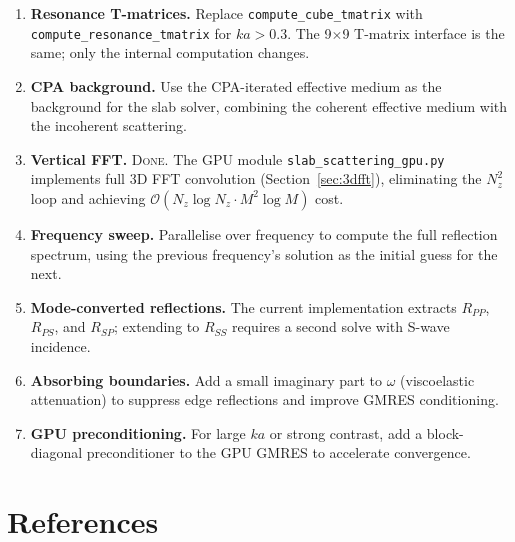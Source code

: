 \documentclass[11pt,a4paper]{article}
\newcommand{\order}{\mathcal{O}}
\begin{document}
\begin{enumerate}
  \item \textbf{Resonance T-matrices.}  Replace
    \texttt{compute\_cube\_tmatrix} with
    \texttt{compute\_resonance\_tmatrix} for $ka > 0.3$.  The
    9$\times$9 T-matrix interface is the same; only the internal
    computation changes.

  \item \textbf{CPA background.}  Use the CPA-iterated effective
    medium as the background for the slab solver, combining
    the coherent effective medium with the incoherent scattering.

  \item \textbf{Vertical FFT.}  \textsc{Done.}  The GPU module
    \texttt{slab\_scattering\_gpu.py} implements full 3D FFT
    convolution (Section~\ref{sec:3dfft}), eliminating the
    $N_z^2$ loop and achieving
    $\order(N_z \log N_z \cdot M^2 \log M)$ cost.

  \item \textbf{Frequency sweep.}  Parallelise over frequency to
    compute the full reflection spectrum, using the previous
    frequency's solution as the initial guess for the next.

  \item \textbf{Mode-converted reflections.}  The current
    implementation extracts $R_{PP}$, $R_{PS}$, and $R_{SP}$;
    extending to $R_{SS}$ requires a second solve with S-wave
    incidence.

  \item \textbf{Absorbing boundaries.}  Add a small imaginary part
    to $\omega$ (viscoelastic attenuation) to suppress edge
    reflections and improve GMRES conditioning.

  \item \textbf{GPU preconditioning.}  For large $ka$ or strong
    contrast, add a block-diagonal preconditioner to the GPU GMRES
    to accelerate convergence.
\end{enumerate}

\section{References}
\end{document}
